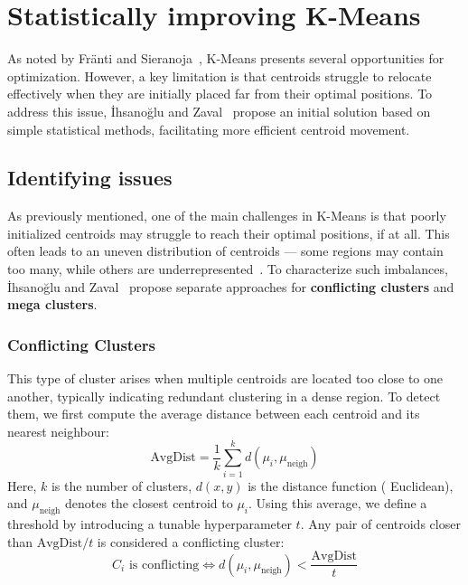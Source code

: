 \documentclass[10pt,twocolumn,letterpaper]{article}
\begin{document}

\section{Statistically improving K-Means}\label{sec:statistically-improving-k-means}

As noted by Fränti and Sieranoja~\cite{FRANTI201995}, K-Means presents several
opportunities for optimization. However, a key limitation is that centroids
struggle to relocate effectively when they are initially placed far from their
optimal positions. To address this issue, İhsanoğlu and
Zaval~\cite{Abdullah10601123} propose an initial solution based on simple
statistical methods, facilitating more efficient centroid movement.


\subsection{Identifying issues}\label{subsec:identifying-issues}

As previously mentioned, one of the main challenges in K-Means is that poorly
initialized centroids may struggle to reach their optimal positions, if at all.
This often leads to an uneven distribution of centroids — some regions may
contain too many, while others are underrepresented~\cite{FRANTI201995}. To
characterize such imbalances, İhsanoğlu and Zaval~\cite{Abdullah10601123}
propose separate approaches for \textbf{conflicting clusters} and \textbf{mega
    clusters}.

\subsubsection{Conflicting Clusters}

This type of cluster arises when multiple centroids are located too close to
one another, typically indicating redundant clustering in a dense region. To
detect them, we first compute the average distance between each centroid and
its nearest neighbour:
\begin{equation}
    \label{eq:avgDist}
    \text{AvgDist} = \frac{1}{k} \sum_{i=1}^{k} d(\mu_i, \mu_{\text{neigh}})
\end{equation}
Here, $k$ is the number of clusters, $d(x,y)$ is the distance function (\eg
Euclidean), and $\mu_{\text{neigh}}$ denotes the closest centroid to $\mu_i$.
Using this average, we define a threshold by introducing a tunable
hyperparameter $t$. Any pair of centroids closer than $\text{AvgDist} / t$ is
considered a conflicting cluster:
\begin{equation}
    \label{eq:conflicting-cluster}
    C_i \text{ is conflicting} \iff d(\mu_i, \mu_{\text{neigh}}) < \frac{\text{AvgDist}}{t}
\end{equation}
\end{document}
